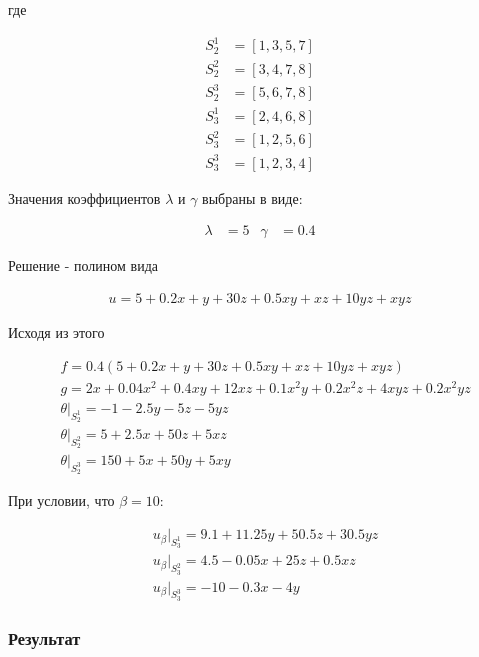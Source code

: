 \documentclass[12pt, a4paper]{article}
\begin{document}
\noindent где

\begin{align*}
  S_2^1 &= \left[ 1, 3, 5, 7 \right] \\
  S_2^2 &= \left[ {3, 4, 7, 8} \right] \\
  S_2^3 &= \left[ {5, 6, 7, 8} \right] \\
  S_3^1 &= \left[ {2, 4, 6, 8} \right] \\
  S_3^2 &= \left[ {1, 2, 5, 6} \right] \\
  S_3^3 &= \left[ {1, 2, 3, 4} \right]
\end{align*}

\noindent Значения коэффициентов $\lambda$ и $\gamma$ выбраны в виде:

\begin{align*}
  \lambda &= 5 & \gamma &= 0.4
\end{align*}

\noindent Решение - полином вида

\begin{align*}
  u = 5 + 0.2x + y + 30z + 0.5xy + xz + 10yz + xyz
\end{align*}

\noindent Исходя из этого

\begin{align*}
  &f = 0.4(5 + 0.2x + y + 30z + 0.5xy + xz + 10yz + xyz) \\[1ex]
  &g = 2x + 0.04x^2 + 0.4xy + 12xz + 0.1x^2y + 0.2x^2z + 4xyz + 0.2x^2yz \\[1ex]
  &\theta|_{S_2^1} = -1 - 2.5y - 5z - 5yz \\[1ex]
  &\theta|_{S_2^2} = 5 + 2.5x + 50z + 5xz \\[1ex]
  &\theta|_{S_2^3} = 150 + 5x + 50y + 5xy
\end{align*}

\noindent При условии, что $\beta = 10$:

\begin{align*}
  &u_{\beta}|_{S_3^1} = 9.1 + 11.25y + 50.5z + 30.5yz \\[1ex]
  &u_{\beta}|_{S_3^2} = 4.5 - 0.05x + 25z + 0.5xz \\[1ex]
  &u_{\beta}|_{S_3^3} = -10 - 0.3x - 4y
\end{align*}

\subsubsection{Результат}
\end{document}

